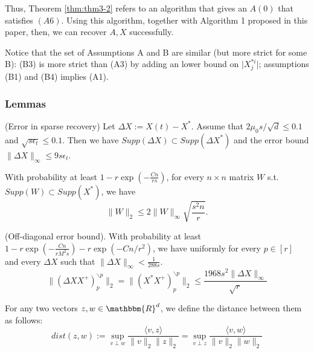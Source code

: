 Thus, Theorem \ref{thm:thm3-2} refers to an algorithm that gives an $A(0)$ that satisfies $(A6)$. Using this algorithm, together with Algorithm 1 proposed in this paper, then, we can recover $A,X$ successfully.

Notice that the set of Assumptions A and B are similar (but more strict for some B): (B3) is more strict than (A3) by adding an lower bound on $\lvert X_j^{*i} \rvert$; assumptions (B1) and (B4) implies (A1).

\subsubsection{Lemmas}

\begin{lemma}
(Error in sparse recovery) Let $\Delta X:=X(t)-X^*$. Assume that $2\mu_0s/\sqrt{d}\leq 0.1$ and $\sqrt{s\epsilon_t}\leq 0.1$. Then we have $Supp(\Delta X) \subset Supp(\Delta X^*)$ and the error bound $\lVert \Delta X \rVert_{\infty} \leq 9s\epsilon_t$.
\label{lemma:l1}
\end{lemma}
\begin{lemma}
With probability at least $1-r \exp(-\frac{Cn}{rs})$, for every $n\times n$ matrix $W$ s.t. $Supp(W)\subset Supp(X^*)$, we have
\begin{equation*}
\lVert W \rVert_2 \leq 2 \lVert W \rVert_{\infty}\sqrt{\frac{s^2n}{r}}.
\end{equation*}
\label{lemma:l2}
\end{lemma}

\begin{lemma}
(Off-diagonal error bound). With probability at least $1-r\exp(-\frac{Cn}{rM^2s})-r\exp(-Cn/r^2)$, we have uniformly for every $p\in [r]$ and every $\Delta X$ such that $\lVert \Delta X\rVert_{\infty}<\frac{1}{288s}$.
\begin{equation*}
\lVert (\Delta XX^{+})_p^{\backslash p} \rVert_2=\lVert (X^*X^{+})_p^{\backslash p} \rVert_2 \leq \frac{1968s^2\lVert \Delta X \rVert_{\infty}}{\sqrt{r}}
\end{equation*}
\label{lemma:l3}
\end{lemma}
\begin{definition}
For any two vectors $z,w\in \mathbbm{R}^d$, we define the distance between them as follows:
\begin{equation*}
dist(z,w):=\sup_{v\perp w}\frac{\langle v,z\rangle }{\lVert v \rVert_2\lVert z \rVert_2}=\sup_{v\perp z}\frac{\langle v,w\rangle }{\lVert v \rVert_2\lVert w \rVert_2}
\end{equation*}
\label{def:def1}
\end{definition}

